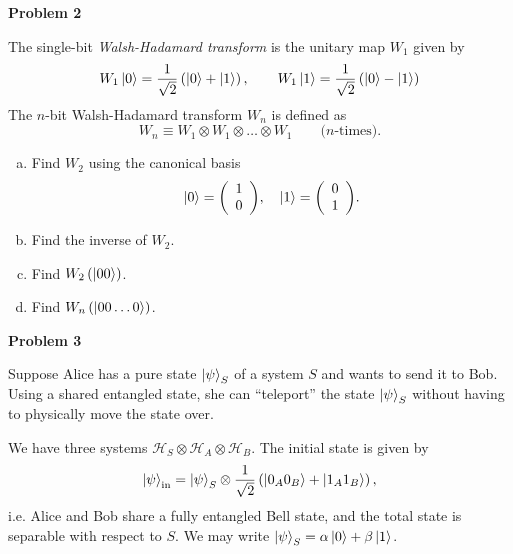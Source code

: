 \documentclass[a4paper,11pt]{article}
\renewcommand{\vector}[2]{{\left(\begin{array}{c} #1 \\ #2 \end{array}\right)}}
\newcommand{\Problem}[1]{
  {
  \vspace*{0.5cm}
  \textsf{\textbf{Problem #1}}
  \vspace*{0.2cm}
  
  }
}
\begin{document}
\Problem{2}
The single-bit {\it Walsh-Hadamard transform} is the unitary map $W_1$ given by
\begin{equation}
W_1\ket{0} = \frac{1}{\sqrt 2} \left(\ket{0}+\ket{1}\right), \qquad W_1\ket{1} = \frac{1}{\sqrt 2} \left(\ket{0}-\ket{1}\right)
\end{equation}
The $n$-bit Walsh-Hadamard transform $W_n$ is defined as
\begin{equation}
W_n \equiv W_1 \otimes W_1 \otimes \dots \otimes W_1 \qquad \text{($n$-times)}.
\end{equation}
\begin{enumerate}[a)]
\item Find $W_2$ using the canonical basis
\begin{equation}
\ket{0} = \vector{1}{0}, \quad \ket{1} = \vector{0}{1}.
\end{equation}
\item Find the inverse of $W_2$.
\item Find $W_2 \left(\ket{00}\right)$.
\item Find $W_n \left(\ket{00\dots0}\right)$.
\end{enumerate}


\Problem{3}

Suppose Alice has a pure state $\ket{\psi}_S$ of a system $S$ and wants to send
it to Bob. Using a shared entangled state, she can ``teleport'' the state
$\ket{\psi}_S$ without having to physically move the state over.

We have three systems $\mathcal{H}_S \otimes \mathcal{H}_A \otimes
\mathcal{H}_B$. The initial state is given by
\begin{equation}
\ket{\psi}_\text{in} = \ket{\psi}_S \otimes \frac{1}{\sqrt 2} \left(\ket{0_A 0_B} + \ket{1_A 1_B}\right),
\end{equation}
i.e. Alice and Bob share a fully entangled Bell state, and the total state is
separable with respect to $S$. We may write $\ket{\psi}_S=\alpha\ket{0}+\beta\ket{1}$.
\end{document}
